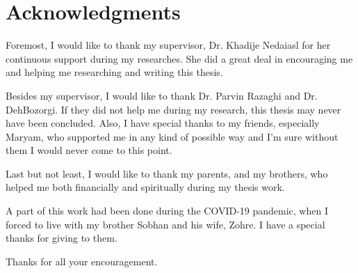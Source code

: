 \section*{\centering Acknowledgments}
Foremost, I would like to thank my supervisor, Dr. Khadije Nedaiasl for her continuous support during my researches. She did a great deal in encouraging me and helping me researching and writing this thesis.

Besides my supervisor, I would like to thank Dr. Parvin Razaghi and Dr. DehBozorgi. If they did not help me during my research, this thesis may never have been concluded.
Also, I have special thanks to my friends, especially Maryam, who supported me in any kind of possible way and I'm sure without them I would never come to this point. 

Last but not least, I would like to thank my parents, and my brothers, who helped me both financially and spiritually during my thesis work.

A part of this work had been done during the COVID-19 pandemic, when I forced to live with my brother Sobhan and his wife, Zohre. I have a special thanks for giving to them.

Thanks for all your encouragement. 
\newpage
\begin{latinabstract}

\end{latinabstract}
% 

